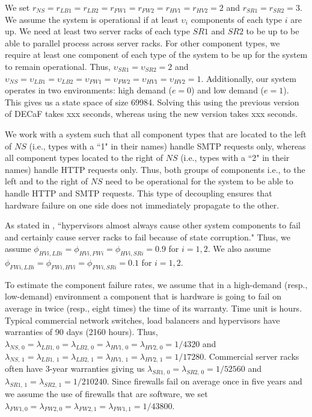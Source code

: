 \documentclass[12pt]{article}
\begin{document}
We set $r_{NS} = r_{LB1} = r_{LB2} = r_{FW1} = r_{FW2} = r_{HV1} = r_{HV2} =
2$ and $r_{SR1} = r_{SR2} = 3$. We assume the system is operational if at
least $\upsilon_i$ components of each type $i$ are up. We need at least two
server racks of each type $SR1$ and $SR2$ to be up to be able to parallel
process across server racks. For other component types, we require at least
one component of each type of the system to be up for the system to remain
operational. Thus, $\upsilon_{SR1} = \upsilon_{SR2} = 2$ and $\upsilon_{NS} =
\upsilon_{LB1} = \upsilon_{LB2} = \upsilon_{FW1} = \upsilon_{FW2} =
\upsilon_{HV1} = \upsilon_{HV2} = 1$. Additionally, our system operates in two
environments: high demand ($e = 0$) and low demand ($e = 1$). This gives us a
state space of size 69984. Solving this using the previous version of DECaF
takes xxx seconds, whereas using the new version takes xxx seconds.

We work with a system such that all component types that are located to the
left of $NS$ (i.e., types with a ``1" in their names) handle SMTP requests
only, whereas all component types located to the right of $NS$ (i.e., types
with a ``2" in their names) handle HTTP requests only. Thus, both groups of
components i.e., to the left and to the right of $NS$ need to be operational
for the system to be able to handle HTTP and SMTP requests. This type of
decoupling ensures that hardware failure on one side does not immediately
propagate to the other.

As stated in \cite{ReHype:2011}, ``hypervisors almost always cause other
system components to fail and certainly cause server racks to fail because of
state corruption." Thus, we assume $\phi_{HVi,LBi} = \phi_{HVi,FWi} =
\phi_{HVi,SRi} = 0.9$ for $i = 1, 2$. We also assume $\phi_{FWi,LBi} = 
\phi_{FWi,HVi} = \phi_{FWi,SRi} = 0.1$ for $i = 1, 2$.

To estimate the component failure rates, we assume that in a high-demand
(resp., low-demand) environment a component that is hardware is going to fail
on average in twice (resp., eight times) the time of its warranty. Time unit
is hours. Typical commercial network switches, load balancers and hypervisors
have warranties of 90 days (2160 hours). Thus, $\lambda_{NS, \, 0} =
\lambda_{LB1, \, 0} = \lambda_{LB2, \, 0} = \lambda_{HV1, \, 0} =
\lambda_{HV2, \, 0} = 1 / 4320$ and $\lambda_{NS, \, 1} = \lambda_{LB1, \, 1}
= \lambda_{LB2, \, 1} = \lambda_{HV1, \, 1} = \lambda_{HV2, \, 1} = 1 /
17280$. Commercial server racks often have 3-year warranties giving us
$\lambda_{SR1,\, 0} = \lambda_{SR2, \, 0} = 1 / 52560$ and $\lambda_{SR1, \,
1} = \lambda_{SR2, \, 1} = 1 / 210240$. Since firewalls fail on average once
in five years and we assume the use of firewalls that are software, we set
$\lambda_{FW1, 0} = \lambda_{FW2, 0} = \lambda_{FW2, 1} = \lambda_{FW1, 1} = 1
/ 43800 $.
\end{document}
